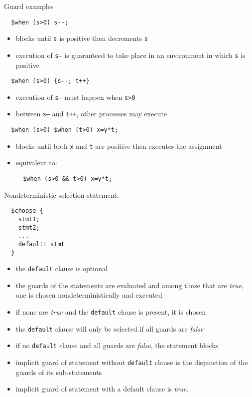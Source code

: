 \documentclass[t]{beamer}
\begin{document}
\begin{frame}[containsverbatim]{Guard examples}
\begin{verbatim}
  $when (s>0) s--;
\end{verbatim}
  \begin{itemize}
  \item blocks until \texttt{s} is positive then decrements \texttt{s}
  \item execution of \texttt{s--} is guaranteed to take place
    in an environment in which \texttt{s} is positive
  \end{itemize}

\begin{verbatim}
  $when (s>0) {s--; t++}
\end{verbatim}
  \begin{itemize}
  \item execution of \texttt{s--} must happen when \texttt{s>0}
  \item between \texttt{s--} and \texttt{t++}, other processes may
    execute
  \end{itemize}

\begin{verbatim}
  $when (s>0) $when (t>0) x=y*t;
\end{verbatim}
  \begin{itemize}
  \item blocks until both \texttt{x} and \texttt{t} are positive then
    executes the assignment
  \item equivalent to:
\begin{verbatim}
  $when (s>0 && t>0) x=y*t;
\end{verbatim}
  \end{itemize}
\end{frame}

\begin{frame}[containsverbatim]{Nondeterministic selection statement: \cchoose}
\begin{verbatim}
  $choose {
    stmt1;
    stmt2;
    ...
    default: stmt
  }
\end{verbatim}

  \begin{itemize}
  \item  the \texttt{default} clause is optional
  \item the guards of the statements are evaluated and among those that are
    \emph{true}, one is chosen nondeterministically and executed
  \item if none are \emph{true} and the \texttt{default} clause is
    present, it is chosen
  \item the \texttt{default} clause will only be selected if all
    guards are \emph{false}
  \item if no \texttt{default} clause and
    all guards are \emph{false}, the statement blocks
  \item implicit
    guard of \cchoose{} statement without \texttt{default} clause is
    the disjunction of the guards of its sub-statements
  \item implicit guard of \cchoose{} statement with a default
    clause is \emph{true}.
  \end{itemize}
\end{frame}
\end{document}
